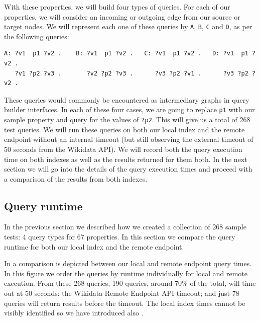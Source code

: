 With these properties, we will build four types of queries. For each of our properties, we will consider an incoming or outgoing edge from our source or target nodes. We will represent each one of these queries by \texttt{A}, \texttt{B}, \texttt{C} and \texttt{D}, as per the following queries: 

\begin{verbatim}
A: ?v1  p1 ?v2 .    B: ?v1  p1 ?v2 .   C: ?v1  p1 ?v2 .   D: ?v1  p1 ?v2 .
   ?v1 ?p2 ?v3 .       ?v2 ?p2 ?v3 .      ?v3 ?p2 ?v1 .      ?v3 ?p2 ?v2 .
\end{verbatim}

These queries would commonly be encountered as intermediary graphs in query builder interfaces. In each of these four cases, we are going to replace \texttt{p1} with our sample property and query for the values of \texttt{?p2}. This will give us a total of 268 test queries. We will run these queries on both our local index and the remote endpoint without an internal timeout (but still observing the external timeout of 50 seconds from the Wikidata API). We will record both the query execution time on both indexes as well as the results returned for them both. In the next section we will go into the details of the query execution times and proceed with a comparison of the results from both indexes.

\subsection{Query runtime}

In the previous section we described how we created a collection of 268 sample tests: 4 query types for 67 properties. In this section we compare the query runtime for both our local index and the remote endpoint.

In  a comparison is depicted between our local and remote endpoint query times. In this figure we order the queries by runtime individually for local and remote execution. From these 268 queries, 190 queries, around 70\% of the total, will time out at 50 seconds: the Wikidata Remote Endpoint API timeout; and just 78 queries will return results before the timeout. The local index times cannot be visibly identified so we have introduced also .

